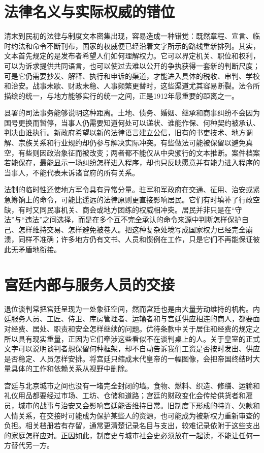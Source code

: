 \section{法律名义与实际权威的错位}

清末到民初的法律与制度文本密集出现，容易造成一种错觉：既然章程、宣言、临时约法和命令不断刊布，国家的权威便已经沿着文字所示的路线重新排列。其实，文本首先规定的是发布者希望人们如何理解权力。它可以界定机关、职位和权利，可以为诉求提供共同语言，也可以使过去难以公开的争执获得一套新的判断尺度；可是它仍需要抄发、解释、执行和申诉的渠道，才能进入具体的税收、审判、学校和治安。战事未歇、财政未稳、人事频繁更替时，这些渠道尤其容易断裂。法令所描绘的统一，与地方能够实行的统一之间，正是1912年最重要的距离之一。

县署的司法事务能够说明这种距离。土地、债务、婚姻、继承和商事纠纷不会因为国号更换而暂停，当事人仍需要知道何处可以递状、谁能作保、何种契约被承认、判决由谁执行。新政府希望以新的法律语言建立公信，旧有的书吏技术、地方调解、宗族关系和行业规约却仍参与解决实际冲突。有些做法可能被保留以避免真空，有些则因政治象征而被改变；两者都不能仅从中央颁行的文本推断。案件档案若能保存，最能显示一场纠纷怎样进入程序，却也只反映愿意并有能力进入程序的当事人，不能代表未诉诸官府的所有关系。

法制的临时性还使地方军令具有异常分量。驻军和军政府在交通、征用、治安或紧急筹饷上的命令，可能比遥远的法律原则更直接影响居民。它们有时填补了行政空缺，有时又同民事机关、商会或地方团练的权威相冲突。居民并非只是在“守法”与“违法”之间选择，而是在多个互不完全承认的命令来源中判断怎样保护自己、怎样维持交易、怎样避免被卷入。把这种复杂处境写成国家权力已经完全崩溃，同样不准确；许多地方仍有文书、人员和惯例在工作，只是它们不再能保证彼此无矛盾地衔接。

\section{宫廷内部与服务人员的交接}

退位谈判常把宫廷呈现为一处象征空间，然而宫廷也是由大量劳动维持的机构。内廷服务人员、工匠、侍卫、库房管理者、运输者和与宫廷供应相连的商人，都要面对经费、居处、职责和安全怎样继续的问题。优待条款中关于居住和经费的规定之所以具有现实重量，正因为它们牵涉这些看似不在谈判桌上的人。关于皇室的正式文字可以说明谈判者想保留何种框架，却不自动告诉我们工资是否按时发出、供应是否稳定、人员怎样安排。将宫廷只缩成末代皇帝的一幅图像，会把帝国终结时大量具体的工作和依赖关系从视野中删除。

宫廷与北京城市之间也没有一堵完全封闭的墙。食物、燃料、织造、修缮、运输和礼仪用品都要经过市场、工坊、仓储和道路；宫廷的财政变化会传给供货者和雇员，城市的战事与治安又会影响宫廷能否维持日常。旧制度下形成的特许、欠款和人情关系，在交接时可能成为保护某些人的资源，也可能成为被新权力重新审查的负担。相关档册若有存留，通常更清楚记录名目与支出，较难记录依附于这些支出的家庭怎样应对。正因如此，制度史与城市社会史必须放在一起读，不能让任何一方替代另一方。

